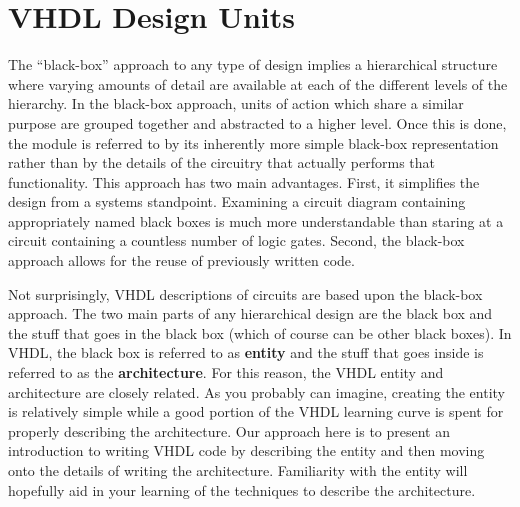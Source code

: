 %
%
%
\chapter{VHDL Design Units}
The ``black-box'' approach to any type of design implies a hierarchical structure where varying amounts of detail are available at each of the different levels of the hierarchy. In the black-box approach, units of action which share a similar purpose are grouped together and abstracted to a higher level. Once this is done, the module is referred to by its inherently more simple black-box representation rather than by the details of the circuitry that actually performs that functionality. This approach has two main advantages. First, it simplifies the design from a systems standpoint. Examining a circuit diagram containing appropriately named black boxes is much more understandable than staring at a circuit containing a countless number of logic gates. Second, the black-box approach allows for the reuse of previously written code.

Not surprisingly, VHDL descriptions of circuits are based upon the black-box approach. The two main parts of any hierarchical design are the black box and the stuff that goes in the black box (which of course can be other black boxes). In VHDL, the black box is referred to as \textbf{entity} and the stuff that goes inside is referred to as the \textbf{architecture}. For this reason, the VHDL entity and architecture are closely related. As you probably can imagine, creating the entity is relatively simple while a good portion of the VHDL learning curve is spent for properly describing the architecture. Our approach here is to present an introduction to writing VHDL code by describing the entity and then moving onto the details of writing the architecture. Familiarity with the entity will hopefully aid in your learning of the techniques to describe the architecture.


